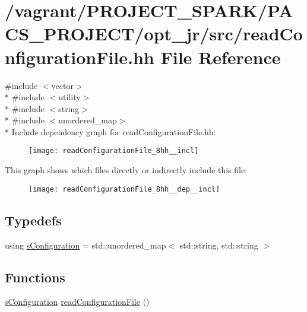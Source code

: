 \hypertarget{readConfigurationFile_8hh}{\section{/vagrant/\-P\-R\-O\-J\-E\-C\-T\-\_\-\-S\-P\-A\-R\-K/\-P\-A\-C\-S\-\_\-\-P\-R\-O\-J\-E\-C\-T/opt\-\_\-jr/src/read\-Configuration\-File.hh File Reference}
\label{readConfigurationFile_8hh}
}
{\ttfamily \#include $<$vector$>$}\\*
{\ttfamily \#include $<$utility$>$}\\*
{\ttfamily \#include $<$string$>$}\\*
{\ttfamily \#include $<$unordered\-\_\-map$>$}\\*
Include dependency graph for read\-Configuration\-File.\-hh\-:\nopagebreak
\begin{figure}[H]
\begin{center}
\leavevmode
\texttt{[image: readConfigurationFile\_8hh\_\_incl]}
\end{center}
\end{figure}
This graph shows which files directly or indirectly include this file\-:\nopagebreak
\begin{figure}[H]
\begin{center}
\leavevmode
\texttt{[image: readConfigurationFile\_8hh\_\_dep\_\_incl]}
\end{center}
\end{figure}
\subsection*{Typedefs}
\begin{DoxyCompactItemize}
\item 
using \hyperlink{readConfigurationFile_8hh_ab8f35b1da3261263c5e9c0e7c8921f5c}{s\-Configuration} = std\-::unordered\-\_\-map$<$ std\-::string, std\-::string $>$
\end{DoxyCompactItemize}
\subsection*{Functions}
\begin{DoxyCompactItemize}
\item 
\hyperlink{readConfigurationFile_8hh_ab8f35b1da3261263c5e9c0e7c8921f5c}{s\-Configuration} \hyperlink{readConfigurationFile_8hh_a4e3ab429a1d72d0d31c7290c97731e1e}{read\-Configuration\-File} ()
\end{DoxyCompactItemize}


